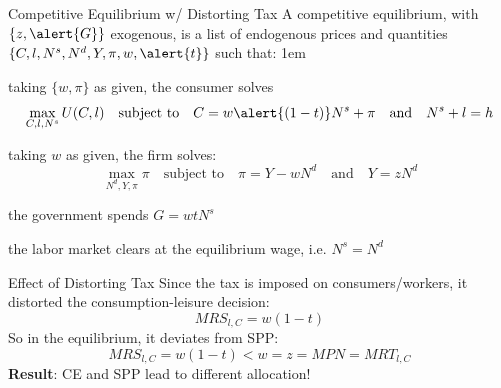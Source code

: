 \documentclass[11pt,aspectratio=43]{beamer}
\let\oldenumerate=\enumerate
\let\endoldenumerate=\endenumerate
\renewenvironment{enumerate}{\oldenumerate \itemsep1em}{ \endoldenumerate}
\theoremstyle{definition}
\begin{document}
\begin{frame}{Competitive Equilibrium w/ Distorting Tax}
\label{slide:Competitive_Equilibrium_w__Distortionary_Tax}
    A competitive equilibrium, with $ \{ z, \alert{G} \} $ exogenous, is a list of endogenous prices and quantities $ \{ C, l, N^{s}, N^{d}, Y, \pi, w, \alert{t} \} $ such that:
    \begin{enumerate}
        \item  taking $ \{ w, \pi \} $ as given, the consumer solves
        \begin{equation*}
            \max_{C, l, N^{s}} U( C, l )
            \quad \text{subject to} \quad
            C = w\alert{( 1-t )}N^{s} + \pi
            \quad \text{and} \quad
            N^{s} + l = h
        \end{equation*}
        \item taking $ w $ as given, the firm solves:
        \begin{equation*}
            \max_{N^{d}, Y, \pi} \pi
            \quad \text{subject to} \quad
            \pi = Y - w N^{d}
            \quad \text{and} \quad
            Y = z N^{d}
        \end{equation*}
        \item the government spends $ G = w t N^{s} $
        \item the labor market clears at the equilibrium wage, i.e. $ N^{s} = N^{d} $
    \end{enumerate}
\end{frame}

\begin{frame}{Effect of Distorting Tax}
\label{slide:Effect_of_Distorting_Tax}
    Since the tax is imposed on consumers/workers, it distorted the consumption-leisure decision:
    \begin{equation*}
        MRS_{l, C} = w( 1-t )
    \end{equation*}
    So in the equilibrium, it deviates from SPP:
    \begin{equation*}
        MRS_{l, C} = w( 1-t ) < w = z = MPN = MRT_{l, C}
    \end{equation*}
    \textbf{Result}: CE and SPP lead to different allocation!
\end{frame}
\end{document}
